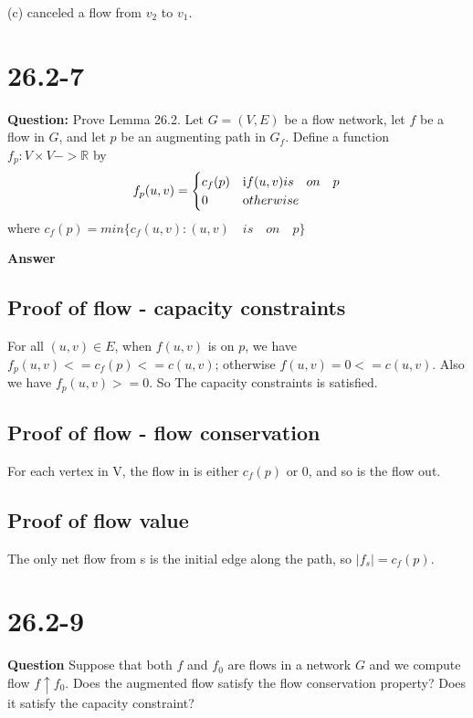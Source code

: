 \documentclass[12pt]{article}
\begin{document}
(c) canceled a flow from $v_2$ to $v_1$.

\section{26.2-7}
\textbf{Question: }
Prove Lemma 26.2. Let $G=(V,E)$ be a flow network, let $f$ be a flow in $G$, and let $p$ be an augmenting path in $G_f$. Define a function $f_p: V \times V -> \mathbb R$ by 
\begin{equation}
\begin{aligned}
f_p(u,v) = 
\begin{cases}
c_f(p) & \mbox if(u,v) is \quad on \quad p\\
0 & \mbox otherwise
\end{cases}
\end{aligned}
\end{equation}
where $c_f(p) = min\{c_f(u,v) : (u,v) \quad is \quad on \quad p\}$

\textbf{Answer}

\subsection{Proof of flow - capacity constraints}
 For all $(u,v) \in E$, when $f(u,v)$ is on $p$, we have $f_p(u,v) <= c_f(p) <= c(u,v)$; otherwise $f(u,v) = 0 < = c(u,v)$. Also we have $f_p(u,v) >= 0$. So The capacity constraints is satisfied.

\subsection{Proof of flow - flow conservation}

For each vertex in V, the flow in is either $c_f(p) $ or 0, and so is the flow out.

\subsection{Proof of flow value}
The only net flow from s is the initial edge along the path, so $|f_s| = c_f(p) $.

\section{26.2-9}
\textbf{Question}
Suppose that both $f$ and $f_0$ are flows in a network $G$ and we compute flow $f \uparrow f_0$. Does the augmented flow satisfy the flow conservation property? Does it satisfy the capacity constraint?
\end{document}
